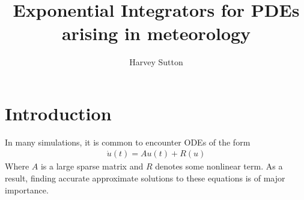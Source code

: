 \documentclass{article}
\begin{document}
\title{Exponential Integrators for PDEs arising in meteorology} 
\maketitle
\author{Harvey Sutton}

\tableofcontents
\newpage

\section {Introduction}
In many simulations, it is common to encounter ODEs of the form
\begin{align}
\dot u(t) = Au(t) + R(u) \label{ODE}
\end{align}
Where $A$ is a large sparse matrix and $R$ denotes some nonlinear term.
As a result, finding accurate approximate solutions to these equations is of major importance.\\
\end{document}
